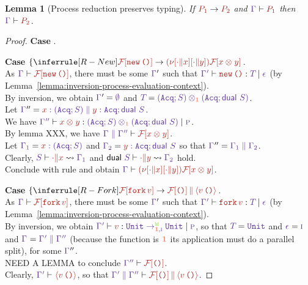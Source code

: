 \documentclass{article}
\newtheorem{lemma}{Lemma}
\begin{document}
\clearpage
\begin{lemma}[Process reduction preserves typing]
  If $\Proc[1] \Reduces \Proc[2]$ and 
  $\ProcHasType {\Ctx} {\Proc[1]}$
  then 
  $\ProcHasType {\Ctx} {\Proc[2]}$.
\end{lemma}
\begin{proof}
  \textbf{Case} .

  \textbf{Case} $\left\{\RuleProcRedNew\right.$.\\
  As $\ProcHasType\Ctx {\FCapp{\EApp \CNew \CUnit}}$, there must be
  some $\Ctx'$ such that
  $\HasType{\Ctx'}{\EApp \CNew \CUnit}{\T}{\Eff}$ (by Lemma~\ref{lemma:inversion-process-evaluation-context}). \\
  By inversion, we obtain $\Ctx' = \CtxEmpty$ and $\T =
  \TPairUnord{(\SSeq{\SAcq}{\S})}{(\SSeq{\SAcq}{\Dual~\S})}$. \\
  Let $\Ctx'' = \CtxPar{\CtxVar x{(\SSeq{\SAcq}{\S})} }{\CtxVar y
    {\SSeq{\SAcq}{\Dual~\S}}}$. \\
  We have
  $\HasType{\Ctx''}{\EPair
    xy}{\TPairUnord{(\SSeq{\SAcq}{\S})}{(\SSeq{\SAcq}{\Dual~\S})}}{\EffPure}$.
  \\
  By lemma XXX, we have
  $\ProcHasType{\CtxPar{\Ctx}{\Ctx''}}{\FCapp{\EPair xy}}$.
  \\
  Let $\Ctx[1] =\CtxVar x{(\SSeq{\SAcq}{\S})}$ and $\Ctx[2] = \CtxVar
  y {\SSeq{\SAcq}{\Dual~\S}}$ so that $\Ctx'' =
  \CtxPar{\Ctx[1]}{\Ctx[2]}$.
  \\
  Clearly, $\S \vdash {\BPar{\BEmp}{x}} \leadsto \Ctx[1]$ and
  $\Dual~\S \vdash {\BPar{\BEmp}{y}} \leadsto \Ctx[2]$ hold.
  \\
  Conclude with rule  and obtain
  $\ProcHasType {\Ctx}
  {\PNew {\BPar{\BEmp}{x}}{\BPar{\BEmp}{y}}{\FCapp{\EPair xy}}}$.

  

  \textbf{Case} $\left\{ \RuleProcRedFork \right.$.\\
  As $\ProcHasType\Ctx {\FCapp{\EApp \CFork \V}}$, there must be some
  $\Ctx'$ such that
  $\HasType{\Ctx'}{\EApp \CFork \V}{\T}{\Eff}$ (by
  Lemma~\ref{lemma:inversion-process-evaluation-context}). \\
  By inversion, we obtain
  $\HasType{\Ctx'}\V{\TArr{\MobMobile}{\DirUnord,\EffImpure}\BUnit\BUnit}\EffPure$,
  so that $\T = \BUnit$ and $\Eff = \EffImpure$ and $\Ctx =
  \CtxPar{\Ctx'}{\Ctx''}$ (because the function is $\DirUnord$ its
  application must do a parallel split), for some $\Ctx''$.
  \\
  NEED A LEMMA to conclude $\ProcHasType{\Ctx''}{\FCapp{\CUnit}}$.
  \\
  Clearly, $\ProcHasType{\Ctx'}{\PExp {\EApp\V\CUnit}}$, so that
  $\ProcHasType{\CtxPar{\Ctx'}{\Ctx''}}{\PPar{\FCapp{\CUnit}}{\PExp {\EApp\V\CUnit}}}$.


\end{proof}
\end{document}
